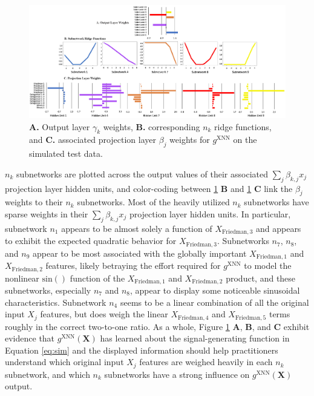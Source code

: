 \documentclass[information,article,submit,moreauthors,pdftex]{definitions/mdpi}
\begin{document}
\begin{figure}[H]
	\hskip-20pt\includegraphics[width=18cm]{img/sim_xnn_glob_ridge.png}
	\caption{\textbf{A.} Output layer $\gamma_k$ weights, \textbf{B.} corresponding $n_k$ ridge functions, and \textbf{C.} associated projection layer $\beta_j$ weights for $g^\text{XNN}$ on the simulated test data.}
	\label{fig:sim_xnn_glob_ridge}
\end{figure} 


\noindent $n_k$ subnetworks are plotted across the output values of their associated $\sum_j\beta_{k,j}x_j$ projection layer hidden units, and color-coding between \ref{fig:sim_xnn_glob_ridge} \textbf{B} and \ref{fig:sim_xnn_glob_ridge} \textbf{C} link the $\beta_j$ weights to their $n_k$ subnetworks. Most of the heavily utilized $n_k$ subnetworks have sparse weights in their $\sum_j\beta_{k,j}x_j$ projection layer hidden units. In particular, subnetwork $n_1$ appears to be almost solely a function of $X_{\text{Friedman}, 3}$ and appears to exhibit the expected quadratic behavior for $X_{\text{Friedman}, 3}$.  Subnetworks $n_7$, $n_8$, and $n_9$ appear to be most associated with the globally important $X_{\text{Friedman}, 1}$ and $X_{\text{Friedman}, 2}$ features, likely betraying the effort required for $g^{\text{XNN}}$ to model the nonlinear $\text{sin}()$ function of the $X_{\text{Friedman}, 1}$ and $X_{\text{Friedman}, 2}$ product, and these subnetworks, especially $n_7$ and $n_8$, appear to display some noticeable sinusoidal characteristics. Subnetwork $n_4$ seems to be a linear combination of all the original input $X_j$ features, but does weigh the linear $X_{\text{Friedman},4}$ and $X_{\text{Friedman},5}$ terms roughly in the correct two-to-one ratio. As a whole, Figure \ref{fig:sim_xnn_glob_ridge} \textbf{A}, \textbf{B}, and \textbf{C} exhibit evidence that $g^\text{XNN}(\mathbf{X})$ has learned about the signal-generating function in Equation \ref{eq:sim} and the displayed information should help practitioners understand which original input $X_j$ features are weighed heavily in each $n_k$ subnetwork, and which $n_k$ subnetworks have a strong influence on $g^\text{XNN}(\mathbf{X})$ output. 
\end{document}
